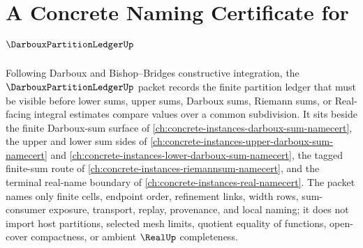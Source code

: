 \chapter{A Concrete Naming Certificate for $\DarbouxPartitionLedgerUp$}
\label{ch:concrete-instances-darboux-partition-ledger-namecert}

Following Darboux and Bishop--Bridges constructive integration, the $\DarbouxPartitionLedgerUp$ packet records the finite partition ledger that must be visible before lower sums, upper sums, Darboux sums, Riemann sums, or Real-facing integral estimates compare values over a common subdivision. It sits beside the finite Darboux-sum surface of \autoref{ch:concrete-instances-darboux-sum-namecert}, the upper and lower sum sides of \autoref{ch:concrete-instances-upper-darboux-sum-namecert} and \autoref{ch:concrete-instances-lower-darboux-sum-namecert}, the tagged finite-sum route of \autoref{ch:concrete-instances-riemannsum-namecert}, and the terminal real-name boundary of \autoref{ch:concrete-instances-real-namecert}. The packet names only finite cells, endpoint order, refinement links, width rows, sum-consumer exposure, transport, replay, provenance, and local naming; it does not import host partitions, selected mesh limits, quotient equality of functions, open-cover compactness, or ambient $\RealUp$ completeness.

